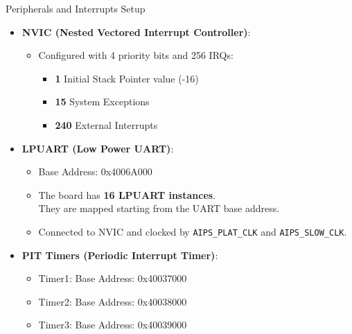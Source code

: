 \begin{frame}{Peripherals and Interrupts Setup}
    \begin{itemize}
        \item \textbf{NVIC (Nested Vectored Interrupt Controller)}:
        \begin{itemize}
            \item Configured with 4 priority bits and 256 IRQs:
                \begin{itemize}
                    \item \textbf{1} Initial Stack Pointer value (-16)
                    \item \textbf{15} System Exceptions
                    \item \textbf{240} External Interrupts
                \end{itemize}
        \end{itemize}
        \item \textbf{LPUART (Low Power UART)}:
        \begin{itemize}
            \item Base Address: 0x4006A000
            \item The board has \textbf{16 LPUART instances}.\\ They are mapped starting from the UART base address. 
            \item Connected to NVIC and clocked by \texttt{AIPS\_PLAT\_CLK} and \texttt{AIPS\_SLOW\_CLK}.
        \end{itemize}
        \item \textbf{PIT Timers (Periodic Interrupt Timer)}:
        \begin{itemize}
            \item Timer1: Base Address: 0x40037000
            \item Timer2: Base Address: 0x40038000
            \item Timer3: Base Address: 0x40039000
        \end{itemize}
    \end{itemize}
\end{frame}

